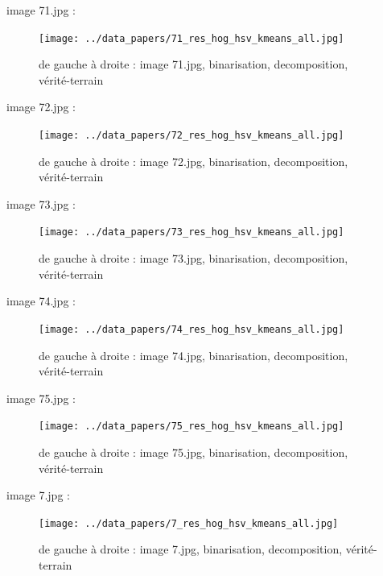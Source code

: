 \documentclass{book}
\begin{document}
image 71.jpg : 
\begin{figure}[H]
\begin{center}
\texttt{[image: ../data\_papers/71\_res\_hog\_hsv\_kmeans\_all.jpg]}
\end{center}
\caption{de gauche à droite : image 71.jpg, binarisation, decomposition, vérité-terrain}
\label{71}
\end{figure}
\clearpage


image 72.jpg : 
\begin{figure}[H]
\begin{center}
\texttt{[image: ../data\_papers/72\_res\_hog\_hsv\_kmeans\_all.jpg]}
\end{center}
\caption{de gauche à droite : image 72.jpg, binarisation, decomposition, vérité-terrain}
\label{72}
\end{figure}
\clearpage


image 73.jpg : 
\begin{figure}[H]
\begin{center}
\texttt{[image: ../data\_papers/73\_res\_hog\_hsv\_kmeans\_all.jpg]}
\end{center}
\caption{de gauche à droite : image 73.jpg, binarisation, decomposition, vérité-terrain}
\label{73}
\end{figure}
\clearpage


image 74.jpg : 
\begin{figure}[H]
\begin{center}
\texttt{[image: ../data\_papers/74\_res\_hog\_hsv\_kmeans\_all.jpg]}
\end{center}
\caption{de gauche à droite : image 74.jpg, binarisation, decomposition, vérité-terrain}
\label{74}
\end{figure}
\clearpage


image 75.jpg : 
\begin{figure}[H]
\begin{center}
\texttt{[image: ../data\_papers/75\_res\_hog\_hsv\_kmeans\_all.jpg]}
\end{center}
\caption{de gauche à droite : image 75.jpg, binarisation, decomposition, vérité-terrain}
\label{75}
\end{figure}
\clearpage


image 7.jpg : 
\begin{figure}[H]
\begin{center}
\texttt{[image: ../data\_papers/7\_res\_hog\_hsv\_kmeans\_all.jpg]}
\end{center}
\caption{de gauche à droite : image 7.jpg, binarisation, decomposition, vérité-terrain}
\label{7}
\end{figure}
\clearpage
\end{document}
